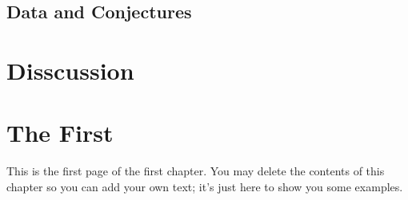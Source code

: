 \documentclass[12pt,twoside]{reedthesis}
\theoremstyle{plain}   %
\theoremstyle{definition}
\theoremstyle{remark}
\numberwithin{equation}{section}
\begin{document}
  \section{Data and Conjectures}
  
  
  \chapter{Disscussion}















   









































































        
    \chapter{The First}
    	This is the first page of the first chapter. You may delete the contents of this chapter so you can add your own text; it's just here to show you some examples. 
	
\end{document}
